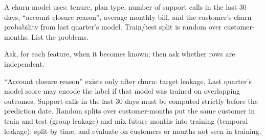 \begin{problem}
	\twochili
	A churn model uses: tenure, plan type, number of support calls in the last 30 days, ``account closure
	reason'', average monthly bill, and the customer's churn probability from last quarter's model. Train/test
	split is random over customer-months. List the problems.
	\begin{hint}
		Ask, for each feature, when it becomes known; then ask whether rows are independent.
	\end{hint}
	\begin{sol}
		``Account closure reason'' exists only after churn: target leakage. Last quarter's model score may encode the
		label if that model was trained on overlapping outcomes. Support calls in the last 30 days must be computed
		strictly before the prediction date. Random splits over customer-months put the same customer in train and
		test (group leakage) and mix future months into training (temporal leakage): split by time, and evaluate on
		customers or months not seen in training.
	\end{sol}
\end{problem}
